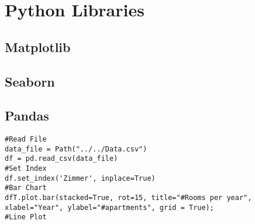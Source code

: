 \section{Python Libraries}
\subsection{Matplotlib}
\subsection{Seaborn}
\subsection{Pandas}
\begin{lstlisting}[style=Python]
#Read File
data_file = Path("../../Data.csv")
df = pd.read_csv(data_file)
#Set Index
df.set_index('Zimmer', inplace=True)
#Bar Chart
dfT.plot.bar(stacked=True, rot=15, title="#Rooms per year", xlabel="Year", ylabel="#apartments", grid = True);
#Line Plot
\end{lstlisting}
